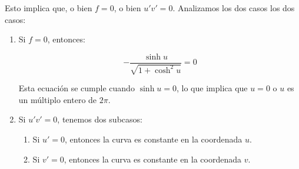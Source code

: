 \begin{problema}
\begin{sol}
Esto implica que, o bien $f = 0$, o bien $u'v' = 0$. Analizamos los dos casos los dos casos:
\begin{enumerate}
    \item Si $f = 0$, entonces:

    $$
    -\frac{\sinh u}{\sqrt{1+\cosh^2 u}} = 0
    $$
    
    Esta ecuación se cumple cuando $\sinh u = 0$, lo que implica que $u = 0$ o $u$ es un múltiplo entero de $2\pi$.
    \item Si $u'v' = 0$, tenemos dos subcasos:
    \begin{enumerate}
        \item Si $u' = 0$, entonces la curva es constante en la coordenada $u$. 
        \item Si $v' = 0$, entonces la curva es constante en la coordenada $v$. 
    \end{enumerate}
    
\end{enumerate}



\end{sol}

\end{problema}


